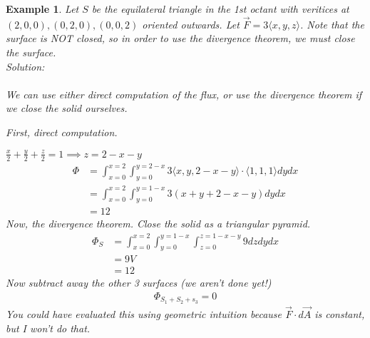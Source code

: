 \documentclass[11pt]{article}
\newtheorem{ex}{Example}
\begin{document}
      \begin{ex}
        Let $S$ be the equilateral triangle in the 1st octant with veritices at $(2,0,0), (0,2,0), (0,0,2)$
        oriented outwards. Let $\vec{F} = 3\langle x,y,z\rangle$. Note that the surface is NOT closed, so in order
        to use the divergence theorem, we must close the surface. \\
        Solution: \\
        \\
        We can use either direct computation of the flux, or use the divergence theorem if we close the solid
        ourselves.

        First, direct computation.

          $\frac{x}{2} + \frac{y}{2} + \frac{z}{2} = 1 \implies z = 2-x-y$
        \begin{align*}
          \Phi
          &= \int_{x=0}^{x=2}\int_{y=0}^{y=2-x} 3\langle x,y, 2-x-y \rangle \cdot \langle 1, 1, 1 \rangle dy dx \\
          &= \int_{x=0}^{x=2}\int_{y=0}^{y=1-x} 3(x + y + 2 - x - y) dy dx \\
          &= 12
        \end{align*}
        Now, the divergence theorem. Close the solid as a triangular pyramid.
        \begin{align*}
          \Phi_{S}
          &= \int_{x=0}^{x=2} \int_{y=0}^{y=1-x}\int_{z=0}^{z=1-x-y} 9 dz dy dx \\
          &= 9V\\
          &= 12
        \end{align*}
        Now subtract away the other 3 surfaces (we aren't done yet!)
        \begin{align*}
          \Phi_{S_{1}+S_{2}+s_{3}} = 0
          \end{align*}
        You could have evaluated this using geometric intuition because $\vec{F} \cdot d\vec{A}$ is constant, but I won't do that.
      \end{ex}
\end{document}
